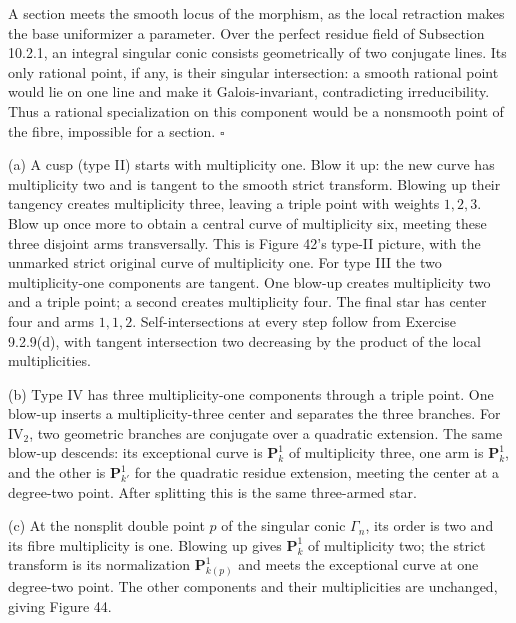 \documentclass[11pt]{article}
\let\chapterexercise\exercise
\renewcommand{\exercise}[2]{\Needspace{8\baselineskip}\chapterexercise{#1}{#2}}
\begin{document}
\pf A section meets the smooth locus of the morphism, as the local retraction makes the base uniformizer a parameter. Over the perfect residue field of Subsection 10.2.1, an integral singular conic consists geometrically of two conjugate lines. Its only rational point, if any, is their singular intersection: a smooth rational point would lie on one line and make it Galois-invariant, contradicting irreducibility. Thus a rational specialization on this component would be a nonsmooth point of the fibre, impossible for a section. \hfill$\square$

\pf (a) A cusp (type II) starts with multiplicity one. Blow it up: the new curve has multiplicity two and is tangent to the smooth strict transform. Blowing up their tangency creates multiplicity three, leaving a triple point with weights $1,2,3$. Blow up once more to obtain a central curve of multiplicity six, meeting these three disjoint arms transversally. This is Figure 42's type-II picture, with the unmarked strict original curve of multiplicity one. For type III the two multiplicity-one components are tangent. One blow-up creates multiplicity two and a triple point; a second creates multiplicity four. The final star has center four and arms $1,1,2$. Self-intersections at every step follow from Exercise 9.2.9(d), with tangent intersection two decreasing by the product of the local multiplicities.

(b) Type IV has three multiplicity-one components through a triple point. One blow-up inserts a multiplicity-three center and separates the three branches. For $\mathrm{IV}_2$, two geometric branches are conjugate over a quadratic extension. The same blow-up descends: its exceptional curve is $\mathbf P^1_k$ of multiplicity three, one arm is $\mathbf P^1_k$, and the other is $\mathbf P^1_{k'}$ for the quadratic residue extension, meeting the center at a degree-two point. After splitting this is the same three-armed star.

(c) At the nonsplit double point $p$ of the singular conic $\Gamma_n$, its order is two and its fibre multiplicity is one. Blowing up gives $\mathbf P^1_k$ of multiplicity two; the strict transform is its normalization $\mathbf P^1_{k(p)}$ and meets the exceptional curve at one degree-two point. The other components and their multiplicities are unchanged, giving Figure 44.
\end{document}
